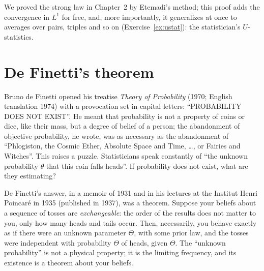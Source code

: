 We proved the strong law in Chapter~2 by Etemadi's method; this proof adds the convergence in $L^1$ for free, and, more importantly, it generalizes at once to averages over pairs, triples and
so on (Exercise~\ref{ex:ustat}): the statistician's $U$-statistics.

\section{De Finetti's theorem}

Bruno de Finetti opened his treatise \emph{Theory of Probability} (1970; English translation 1974) with a provocation set in capital letters:
``PROBABILITY DOES NOT EXIST''. He meant that probability is not a property of coins or dice, like their mass, but a degree of belief of a person; the
abandonment of objective probability, he wrote, was as necessary as the abandonment of ``Phlogiston, the Cosmic Ether, Absolute Space and Time, \ldots, or Fairies and Witches''.
This raises a puzzle. Statisticians speak constantly of ``the unknown probability $\theta$ that this coin falls heads''. If probability does not exist, what are they estimating?

De Finetti's answer, in a memoir of 1931 and in his lectures at the Institut Henri Poincar\'e in 1935 (published in 1937), was a theorem. Suppose your beliefs about a sequence of tosses are
\emph{exchangeable}: the order of the results does not matter to you, only how many heads and tails occur. Then, necessarily, you behave exactly as if there were an unknown parameter $\Theta$,
with some prior law, and the tosses were independent with probability $\Theta$ of heads, given $\Theta$. The ``unknown probability'' is not a physical property; it is the limiting frequency,
and its existence is a theorem about your beliefs.

